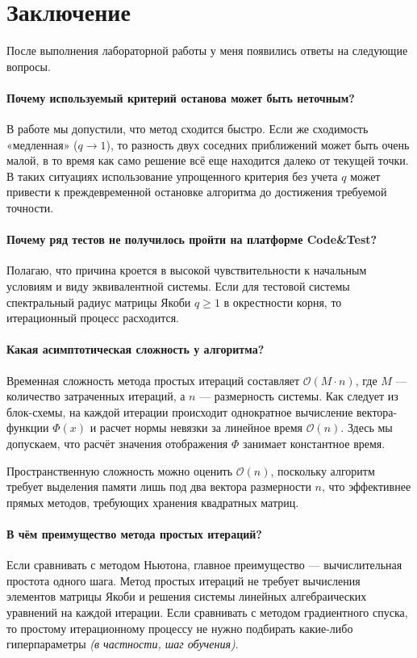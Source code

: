 \section{Заключение}

После выполнения лабораторной работы у меня появились ответы на следующие вопросы.

\paragraph{Почему используемый критерий останова может быть неточным?} 
В работе мы допустили, что метод сходится быстро. Если же сходимость «медленная» ($q \to 1$), то разность двух соседних приближений может быть очень малой, в то время как само решение всё еще находится далеко от текущей точки. В таких ситуациях использование упрощенного критерия без учета $q$ может привести к преждевременной остановке алгоритма до достижения требуемой точности.

\paragraph{Почему ряд тестов не получилось пройти на платформе Code\&Test?} 
Полагаю, что причина кроется в высокой чувствительности к начальным условиям и виду эквивалентной системы. Если для тестовой системы спектральный радиус матрицы Якоби $q \ge 1$ в окрестности корня, то итерационный процесс расходится.

\paragraph{Какая асимптотическая сложность у алгоритма?}
Временная сложность метода простых итераций составляет $\mathcal{O}(M \cdot n)$, где $M$ — количество затраченных итераций, а $n$ — размерность системы. Как следует из блок-схемы, на каждой итерации происходит однократное вычисление вектора-функции $\Phi(x)$ и расчет нормы невязки за линейное время $\mathcal{O}(n)$. Здесь мы допускаем, что расчёт значения отображения \( \Phi \) занимает константное время.

Пространственную сложность можно оценить $\mathcal{O}(n)$, поскольку алгоритм требует выделения памяти лишь под два вектора размерности $n$, что эффективнее прямых методов, требующих хранения квадратных матриц.

\paragraph{В чём преимущество метода простых итераций?} 
Если сравнивать с методом Ньютона, главное преимущество --- вычислительная простота одного шага. Метод простых итераций не требует вычисления элементов матрицы Якоби и решения системы линейных алгебраических уравнений на каждой итерации. Если сравнивать с методом градиентного спуска, то простому итерационному процессу не нужно подбирать какие-либо гиперпараметры \textit{(в частности, шаг обучения)}.

